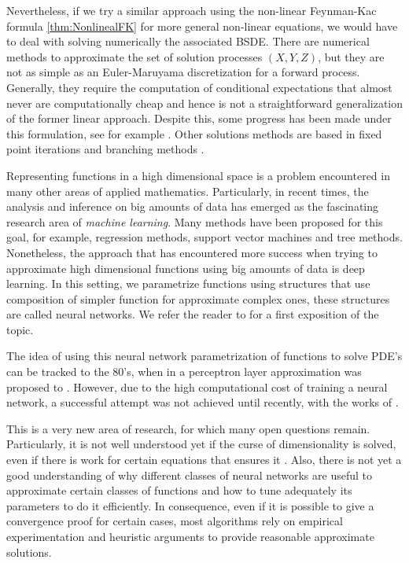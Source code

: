 Nevertheless, if we try a similar approach using the non-linear Feynman-Kac formula \ref{thm:NonlinealFK} for more general non-linear equations, we would have to deal with solving numerically the associated BSDE. There are numerical methods to approximate the set of solution processes $(X,Y,Z)$, but they are not as simple as an Euler-Maruyama discretization for a forward process. Generally, they require the computation of conditional expectations that almost never are computationally cheap and hence is not a straightforward generalization of the former linear approach. Despite this, some progress has been made under this formulation, see for example \cite{chessari_numerical_nodate}. Other solutions methods are based in fixed point iterations and branching methods \cite{bibid}.

Representing functions in a high dimensional space is a problem encountered in many other areas of applied mathematics. Particularly, in recent times, the analysis and inference on big amounts of data has emerged as the fascinating research area of \textit{machine learning}. Many methods have been proposed for this goal, for example, regression methods, support vector machines and tree methods. Nonetheless, the approach that has encountered more success when trying to approximate high dimensional functions using big amounts of data is deep learning.  In this setting, we parametrize functions using structures that use composition of simpler function for approximate complex ones, these structures are called neural networks. We refer the reader to \cite{higham_deep_2019} for a first exposition of the topic.

The idea of using this neural network parametrization of functions to solve PDE's can be tracked to the 80's, when in \cite{} a perceptron layer approximation was proposed to \hlc[Completar]{}. However, due to the high computational cost of training a neural network, a successful attempt was not achieved until recently, with the works of \cite{bibid}\hlc[Blablabla]{}. 

This is a very new area of research, for which many open questions remain. Particularly, it is not well understood yet if the curse of dimensionality is solved, even if there is work for certain equations that ensures it \cite{bibid}. Also, there is not yet a good understanding of why different classes of neural networks are useful to approximate certain classes of functions and how to tune adequately its parameters to do it efficiently. In consequence, even if it is possible to give a convergence proof for certain cases, most algorithms rely on empirical experimentation and heuristic arguments to provide reasonable approximate solutions.    


